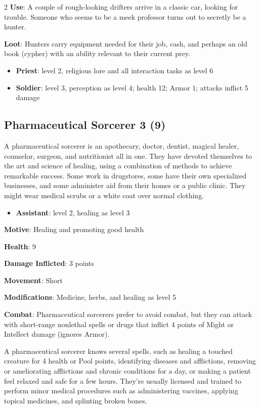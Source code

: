 \begin{multicols}{2}
\textbf{Use}: A couple of rough-looking drifters arrive in a classic car, looking for trouble. Someone who seems to be a meek professor turns out to secretly be a hunter. 

\textbf{Loot}: Hunters carry equipment needed for their job, cash, and perhaps an old book (cypher) with an ability relevant to their current prey.

\begin{itemize}	
\item \textbf{Priest}: level 2, religious lore and all interaction tasks as level 6 
\item \textbf{Soldier}: level 3, perception as level 4; health 12; Armor 1; attacks inflict 5 damage
\end{itemize}

\subsection{Pharmaceutical Sorcerer 3 (9)}

A pharmaceutical sorcerer is an apothecary, doctor, dentist, magical healer, counselor, surgeon, and nutritionist all in one. They have devoted themselves to the art and science of healing, using a combination of methods to achieve remarkable success. Some work in drugstores, some have their own specialized businesses, and some administer aid from their homes or a public clinic. They might wear medical scrubs or a white coat over normal clothing.

\begin{itemize}
\item \textbf{Assistant}: level 2, healing as level 3
\end{itemize}

\textbf{Motive}: Healing and promoting good health 

\textbf{Health}: 9 

\textbf{Damage Inflicted}: 3 points 

\textbf{Movement}: Short 

\textbf{Modifications}: Medicine, herbs, and healing as level 5 

\textbf{Combat}: Pharmaceutical sorcerers prefer to avoid combat, but they can attack with short-range nonlethal spells or drugs that inflict 4 points of Might or Intellect damage (ignores Armor).

A pharmaceutical sorcerer knows several spells, such as healing a touched creature for 4 health or Pool points, identifying diseases and afflictions, removing or ameliorating afflictions and chronic conditions for a day, or making a patient feel relaxed and safe for a few hours. They’re usually licensed and trained to perform minor medical procedures such as administering vaccines, applying topical medicines, and splinting broken bones. 


\end{multicols}
